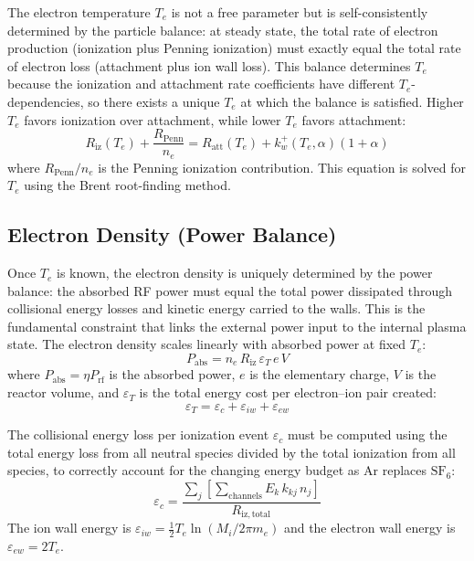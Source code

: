 \documentclass[11pt,a4paper]{report}
\newcommand{\SFsix}{\mathrm{SF}_6}
\newcommand{\Te}{T_e}
\begin{document}
The electron temperature $\Te$ is not a free parameter but is self-consistently determined by the particle balance: at steady state, the total rate of electron production (ionization plus Penning ionization) must exactly equal the total rate of electron loss (attachment plus ion wall loss).  This balance determines $\Te$ because the ionization and attachment rate coefficients have different $\Te$-dependencies, so there exists a unique $\Te$ at which the balance is satisfied.  Higher $\Te$ favors ionization over attachment, while lower $\Te$ favors attachment:
\begin{equation}
\boxed{R_\mathrm{iz}(\Te) + \frac{R_\mathrm{Penn}}{n_e} = R_\mathrm{att}(\Te) + k_w^+(\Te,\alpha)(1+\alpha)}
\label{eq:gas_Te_balance}
\end{equation}
where $R_\mathrm{Penn}/n_e$ is the Penning ionization contribution.  This equation is solved for $\Te$ using the Brent root-finding method.

\subsection{Electron Density (Power Balance)}
\label{sec:gasphase_ne}

Once $\Te$ is known, the electron density is uniquely determined by the power balance: the absorbed RF power must equal the total power dissipated through collisional energy losses and kinetic energy carried to the walls.  This is the fundamental constraint that links the external power input to the internal plasma state.  The electron density scales linearly with absorbed power at fixed $\Te$:
\begin{equation}
\boxed{P_\mathrm{abs} = n_e\, R_\mathrm{iz}\, \varepsilon_T\, e\, V}
\label{eq:gas_power_balance}
\end{equation}
where $P_\mathrm{abs} = \eta P_\mathrm{rf}$ is the absorbed power, $e$ is the elementary charge, $V$ is the reactor volume, and $\varepsilon_T$ is the total energy cost per electron--ion pair created:
\begin{equation}
\varepsilon_T = \varepsilon_c + \varepsilon_{iw} + \varepsilon_{ew}
\label{eq:gas_epsT}
\end{equation}

The collisional energy loss per ionization event $\varepsilon_c$ must be computed using the total energy loss from all neutral species divided by the total ionization from all species, to correctly account for the changing energy budget as Ar replaces $\SFsix$:
\begin{equation}
\boxed{\varepsilon_c = \frac{\displaystyle\sum_j \left[ \sum_{\text{channels}} E_k\, k_{kj}\, n_j \right]}{R_\mathrm{iz,total}}}
\label{eq:gas_Ec}
\end{equation}
The ion wall energy is $\varepsilon_{iw} = \frac{1}{2}\Te \ln(M_i / 2\pi m_e)$ and the electron wall energy is $\varepsilon_{ew} = 2\Te$.
\end{document}
